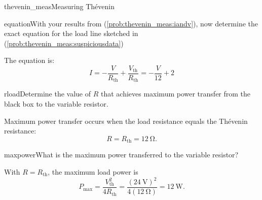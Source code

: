 \begin{mainquestion}{thevenin_meas}{Measuring Thévenin}
\begin{partquestion}{equation}{With your results from (\cref{prob:thevenin_meas:iandv}), now determine the exact equation for the load line sketched in (\cref{prob:thevenin_meas:suspiciousdata}) }
\begin{answer}
The equation is:
\[
    I=-\frac{V}{R_\mathrm{th}}+\frac{V_\mathrm{th}}{R_\mathrm{th}}
      =-\frac{V}{12}+2
  \]
\end{answer}
\end{partquestion}
\begin{partquestion}{rload}{Determine the value of $R$ that achieves maximum power transfer from the black box to the variable resistor.}
\begin{answer}
Maximum power transfer occurs when the load resistance equals the Th\'evenin
  resistance:
  \[
    \boxed{R=R_{\mathrm{th}}=\qty{12}{\ohm}.}
  \]
\end{answer}
\end{partquestion}
\begin{partquestion}{maxpower}{What is the maximum power transferred to the variable resistor?}
\begin{answer}
 With $R=R_{\mathrm{th}}$, the maximum load power is
  \[
    P_{\max}=\frac{V_{\mathrm{th}}^2}{4R_{\mathrm{th}}}
      =\frac{(\qty{24}{\volt})^2}{4(\qty{12}{\ohm})}
      =\boxed{\qty{12}{\watt}}.
  \]
\end{answer}
\end{partquestion}

\end{mainquestion}